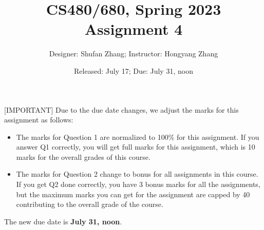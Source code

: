 \documentclass{article}
\title{\large CS480/680, Spring 2023\\\huge Assignment 4}
\author{Designer: Shufan Zhang; Instructor: Hongyang Zhang}
\date{Released: July 17; Due: July 31, noon}
\newcommand{\0}{\mathbf{0}}
\newcommand{\1}{\mathbf{1}}
\begin{document}
\maketitle

{\color{red}[IMPORTANT] Due to the due date changes, we adjust the marks for this assignment as follows:
\begin{itemize}
    \item The marks for Question 1 are normalized to 100\% for this assignment. If you answer Q1 correctly, you will get full marks for this assignment, which is 10 marks for the overall grades of this course.

    \item The marks for Question 2 change to bonus for all assignments in this course. If you get Q2 done correctly, you have 3 bonus marks for all the assignments, but the maximum marks you can get for the assignment are capped by 40 contributing to the overall grade of the course.
\end{itemize}
The new due date is \textbf{July 31, noon}.
}
\end{document}
